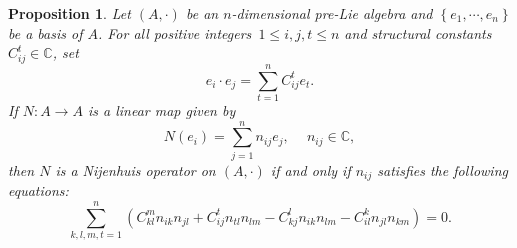 \documentclass[12pt, reqno]{amsart}
\theoremstyle{plain}
\newtheorem{proposition}[theorem]{Proposition}
\begin{document}
\begin{proposition}\label{PRO: Structural constants}
Let $(A, \cdot)$  be an $n$-dimensional pre-Lie algebra and  $\left\{e_{1}, \cdots, e_{n}\right\}$  be a basis of  $A$. For all positive integers~$1\leq i, j, t\leq n$ and structural constants $C_{i j}^{t}\in \mathbb{C}$,  set
\begin{equation}\label{eq:pre-Lie-muilt}
  e_{i} \cdot e_{j}=\sum_{t=1}^{n} C_{i j}^{t} e_{t}.
\end{equation}
If  $N:A\rightarrow A$ is a linear map given by
\begin{equation}\label{eq:Nii-mulit}
  N\left(e_{i}\right)=\sum_{j=1}^{n} n_{i j} e_{j}, \quad ~n_{i j}\in\mathbb{C},
\end{equation}
then $N$ is a Nijenhuis operator  on $(A, \cdot)$ if and only if $n_{i j}$ satisfies the following equations:
\begin{equation}\label{structural constants}
  \sum_{k, l, m,t=1}^{n}\left(C_{k l}^{m} n_{i k} n_{j l}+C_{i j}^{t} n_{t l}n_{l m}-C_{k j}^{l} n_{i k} n_{l m}-C_{i l}^{k} n_{j l} n_{k m}\right)=0.
\end{equation}
\end{proposition}
\end{document}
